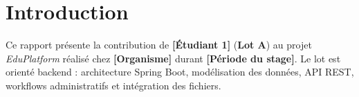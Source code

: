 \chapter*{Introduction}

Ce rapport présente la contribution de \textbf{[Étudiant 1]} (\textbf{Lot A}) au projet \textit{EduPlatform} réalisé chez \textbf{[Organisme]} durant \textbf{[Période du stage]}. Le lot est orienté backend : architecture Spring Boot, modélisation des données, API REST, workflows administratifs et intégration des fichiers.
